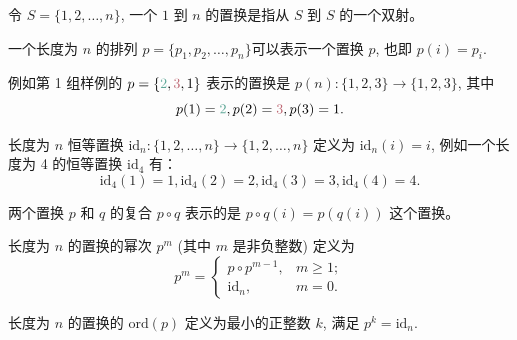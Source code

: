 令 $S = \{1, 2, \ldots, n\}$, 一个 $1$ 到 $n$ 的置换是指从 $S$ 到 $S$ 的一个双射。


一个长度为 $n$ 的排列 $p = \{p_1, p_2, \ldots, p_n \}$可以表示一个置换 $p$, 也即 $p(i) = p_i$.

例如第 1 组样例的 $p = \{{\color[rgb]{0.36,0.65,0.59}2}, {\color[rgb]{0.75,0.41,0.46}3}, 1\}$ 表示的置换是 $p(n): \{1, 2, 3\} \rightarrow \{1, 2, 3\}$, 其中
\[
   p(1) = {\color[rgb]{0.36,0.65,0.59}2}, p(2) = {\color[rgb]{0.75,0.41,0.46}3}, p(3) = 1.
\]

长度为 $n$ 恒等置换 $\text{id}_n: \{1, 2, \ldots, n\} \rightarrow \{1, 2, \ldots, n\}$ 定义为 $\text{id}_n(i) = i$, 例如一个长度为 4 的恒等置换 $\text{id}_4$ 有：
\[
   \text{id}_4(1) = 1, \text{id}_4(2) = 2, \text{id}_4(3) = 3, \text{id}_4(4) = 4.
\]

两个置换 $p$ 和 $q$ 的复合 $p \circ q$ 表示的是 $p \circ q(i) = p(q(i))$ 这个置换。

长度为 $n$ 的置换的幂次 $p^m$ (其中 $m$ 是非负整数) 定义为
\[
   p^m = \begin{cases}
      p \circ p^{m - 1}, &m \ge 1;\\
      \text{id}_n, & m = 0.
   \end{cases}
\]

长度为 $n$ 的置换的 $\text{ord}(p)$ 定义为最小的正整数 $k$, 满足 $p^{k} = \text{id}_n$.




